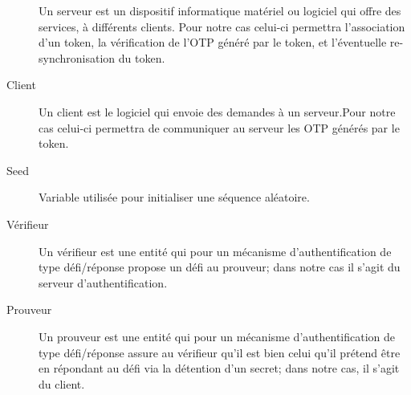 \documentclass{"../../res/univ-projet"}
\begin{document}
\begin{description}
  	Un serveur est un dispositif informatique mat\'{e}riel ou logiciel qui offre 
  	des services, à diff\'{e}rents clients. Pour notre cas celui-ci permettra 
  	l'association d'un token, la v\'{e}rification de l'OTP g\'{e}n\'{e}r\'{e} par 
  	le token, et l'\'{e}ventuelle re-synchronisation du token.
 	\\ 
	\item[Client]
  	Un client est le logiciel qui envoie des demandes à un serveur.Pour notre 
  	cas celui-ci permettra de communiquer au serveur les OTP g\'{e}n\'{e}r\'{e}s 
  	par le token.
   	\\ 
    \item[Seed] Variable utilis\'ee pour initialiser une s\'equence al\'eatoire.
    \\
    \item[Vérifieur] Un vérifieur est une entité qui pour un mécanisme 
    d'authentification de type défi/réponse propose un défi au prouveur; dans notre
    cas il s'agit du serveur d'authentification.
    \\
    \item[Prouveur] Un prouveur est une entité qui pour un mécanisme 
    d'authentification de type défi/réponse assure au vérifieur qu'il est bien celui qu'il
    prétend être en répondant au défi via la détention d'un secret; dans notre cas,
    il s'agit du client.
\end{description}

\end{document}
